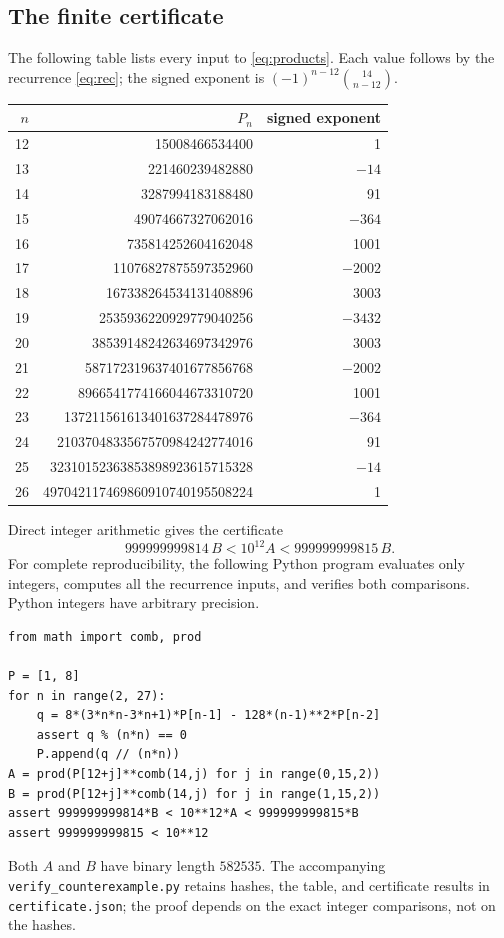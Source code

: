 \documentclass[11pt]{article}
\begin{document}
\subsection*{The finite certificate}
The following table lists every input to \eqref{eq:products}.
Each value follows by the recurrence \eqref{eq:rec}; the signed
exponent is $(-1)^{n-12}\binom{14}{n-12}$.
\begin{center}
\begin{tabular}{r|r|r}
 $n$ & $P_n$ & signed exponent\\\hline
12 & 15008466534400 & 1\\
13 & 221460239482880 & $-14$\\
14 & 3287994183188480 & 91\\
15 & 49074667327062016 & $-364$\\
16 & 735814252604162048 & 1001\\
17 & 11076827875597352960 & $-2002$\\
18 & 167338264534131408896 & 3003\\
19 & 2535936220929779040256 & $-3432$\\
20 & 38539148242634697342976 & 3003\\
21 & 587172319637401677856768 & $-2002$\\
22 & 8966541774166044673310720 & 1001\\
23 & 137211561613401637284478976 & $-364$\\
24 & 2103704833567570984242774016 & 91\\
25 & 32310152363853898923615715328 & $-14$\\
26 & 497042117469860910740195508224 & 1
\end{tabular}
\end{center}
Direct integer arithmetic gives the certificate
\begin{equation}\label{eq:integer}
 999999999814\,B<10^{12}A<999999999815\,B.
\end{equation}
For complete reproducibility, the following Python program evaluates
only integers, computes all the recurrence inputs, and verifies both
comparisons. Python integers have arbitrary precision.
\begin{verbatim}
from math import comb, prod

P = [1, 8]
for n in range(2, 27):
    q = 8*(3*n*n-3*n+1)*P[n-1] - 128*(n-1)**2*P[n-2]
    assert q % (n*n) == 0
    P.append(q // (n*n))
A = prod(P[12+j]**comb(14,j) for j in range(0,15,2))
B = prod(P[12+j]**comb(14,j) for j in range(1,15,2))
assert 999999999814*B < 10**12*A < 999999999815*B
assert 999999999815 < 10**12
\end{verbatim}
Both $A$ and $B$ have binary length $582535$. The accompanying
\texttt{verify\_counterexample.py} retains hashes, the table, and
certificate results in \texttt{certificate.json}; the proof depends
on the exact integer comparisons, not on the hashes.
\end{document}
